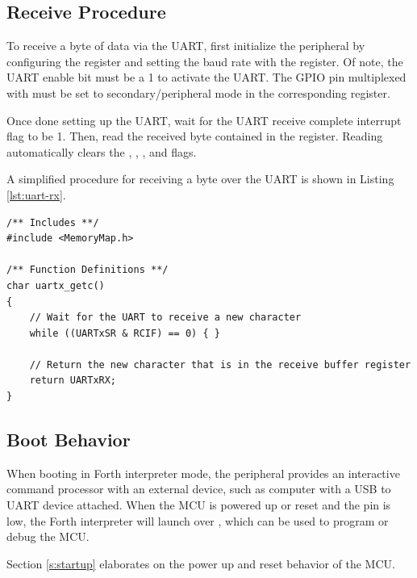\subsection{Receive Procedure}

To receive a byte of data via the UART, first initialize the  peripheral by configuring the  register and setting the baud rate with the  register. Of note, the UART enable bit  must be a 1 to activate the UART. The GPIO pin multiplexed with  must be set to secondary/peripheral mode in the corresponding  register.

Once done setting up the UART, wait for the UART receive complete interrupt flag  to be 1. Then, read the received byte contained in the  register. Reading  automatically clears the , , , and  flags.

A simplified procedure for receiving a byte over the UART is shown in Listing \ref{lst:uart-rx}.

\begin{lstlisting}[style=customC, label=lst:uart-rx, caption={Example Function for UART Receptions}]
/** Includes **/
#include <MemoryMap.h>

/** Function Definitions **/
char uartx_getc()
{
	// Wait for the UART to receive a new character
	while ((UARTxSR & RCIF) == 0) { }
	
	// Return the new character that is in the receive buffer register
	return UARTxRX;
}
\end{lstlisting}



\subsection{ Boot Behavior}

When booting in Forth interpreter mode, the  peripheral provides an interactive command processor with an external device, such as computer with a USB to UART device attached. When the MCU is powered up or reset and the  pin is low, the Forth interpreter will launch over , which can be used to program or debug the MCU.

Section \ref{s:startup} elaborates on the power up and reset behavior of the MCU.
